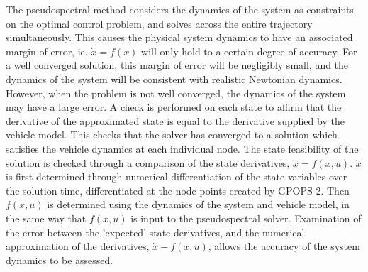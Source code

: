 The pseudospectral method considers the dynamics of the system as constraints on the optimal control problem, and solves across the entire trajectory simultaneously. This causes the physical system dynamics to have an associated margin of error, ie. $\dot{x} = f(x)$ will only hold to a certain degree of accuracy. For a well converged solution, this margin of error will be negligibly small, and the dynamics of the system will be consistent with realistic Newtonian dynamics. However, when the problem is not well converged, the dynamics of the system may have a large error.
A check is performed on each state to affirm that the derivative of the approximated state is equal to the derivative supplied by the vehicle model. This checks that the solver has converged to a solution which satisfies the vehicle dynamics at each individual node. 
The state feasibility of the solution is checked through a comparison of the state derivatives, $\dot{x} = f(x,u)$. $\dot{x}$ is first determined through numerical differentiation of the state variables over the solution time, differentiated at the node points created by GPOPS-2. Then $f(x,u)$ is determined using the dynamics of the system and vehicle model, in the same way that $f(x,u)$ is input to the pseudospectral solver. Examination of the error between the 'expected' state derivatives, and the numerical approximation of the derivatives, $\dot{x} - f(x,u)$, allows the accuracy of the system dynamics to be assessed. 




